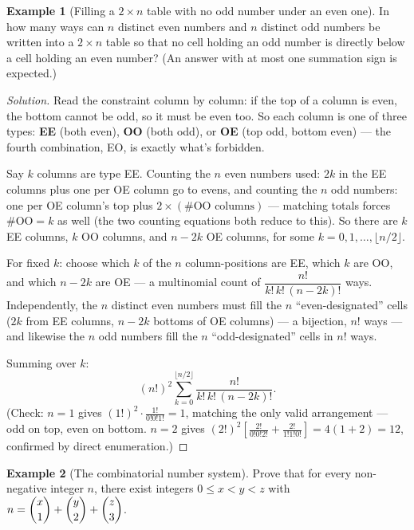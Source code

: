 \documentclass[11pt]{article}
\theoremstyle{definition}
\newtheorem{example}{Example}[section]
\begin{document}
\begin{example}[Filling a $2\times n$ table with no odd number under an even one]
In how many ways can $n$ distinct even numbers and $n$ distinct odd numbers be written into a $2\times n$ table so that no cell holding an odd number is directly below a cell holding an even number? (An answer with at most one summation sign is expected.)
\end{example}

\begin{proof}[Solution]
Read the constraint column by column: if the top of a column is even, the bottom cannot be odd, so it must be even too. So each column is one of three types: \textbf{EE} (both even), \textbf{OO} (both odd), or \textbf{OE} (top odd, bottom even) — the fourth combination, EO, is exactly what's forbidden.

Say $k$ columns are type EE. Counting the $n$ even numbers used: $2k$ in the EE columns plus one per OE column go to evens, and counting the $n$ odd numbers: one per OE column's top plus $2\times(\#\text{OO columns})$ — matching totals forces $\#\text{OO}=k$ as well (the two counting equations both reduce to this). So there are $k$ EE columns, $k$ OO columns, and $n-2k$ OE columns, for some $k=0,1,\dots,\lfloor n/2\rfloor$.

For fixed $k$: choose which $k$ of the $n$ column-positions are EE, which $k$ are OO, and which $n-2k$ are OE — a multinomial count of $\dfrac{n!}{k!\,k!\,(n-2k)!}$ ways. Independently, the $n$ distinct even numbers must fill the $n$ ``even-designated'' cells ($2k$ from EE columns, $n-2k$ bottoms of OE columns) — a bijection, $n!$ ways — and likewise the $n$ odd numbers fill the $n$ ``odd-designated'' cells in $n!$ ways.

Summing over $k$:
\[
\boxed{(n!)^2\sum_{k=0}^{\lfloor n/2\rfloor}\frac{n!}{k!\,k!\,(n-2k)!}}.
\]
(Check: $n=1$ gives $(1!)^2\cdot\frac{1!}{0!0!1!}=1$, matching the only valid arrangement — odd on top, even on bottom. $n=2$ gives $(2!)^2\left[\frac{2!}{0!0!2!}+\frac{2!}{1!1!0!}\right]=4(1+2)=12$, confirmed by direct enumeration.)
\end{proof}

\begin{example}[The combinatorial number system]
Prove that for every non-negative integer $n$, there exist integers $0\le x<y<z$ with $n=\dbinom x1+\dbinom y2+\dbinom z3$.
\end{example}
\end{document}
